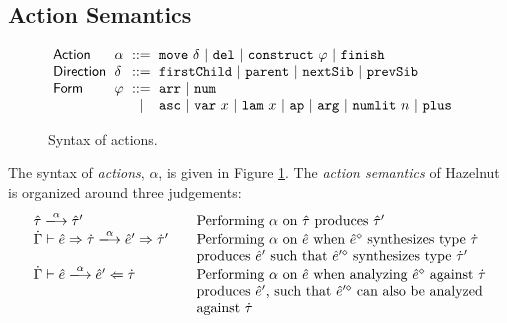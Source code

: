 \documentclass{llncs}
\begin{document}
\subsection{Action Semantics}\label{sec:actions}
\begin{figure}[t]
\hspace{-3px}$\arraycolsep=3pt\begin{array}{llcllll}
\mathsf{Action} & \alpha & ::= &
  \aMove{\delta} ~\vert~
  \aDel ~\vert~
  \aConstruct{\varphi} ~\vert~
  \aFinish\\
\mathsf{Direction} & \delta & ::= &
  \dChild ~\vert~
  \dParent ~\vert~
  \dNext ~\vert~
  \dPrev\\
\mathsf{Form} & \varphi & ::= &
  \farr ~\vert~
  \fnum \\
& & \vert &
  \fasc ~\vert~
  \fvar{x} ~\vert~
  \flam{x} ~\vert~
  \fap ~\vert~
  \farg ~\vert~
  \fnumlit{n} ~\vert~
  \fplus
\end{array}$
\caption{Syntax of actions.}
\label{fig:action-syntax}
\end{figure}

The syntax of \emph{actions}, $\alpha$, is given in Figure \ref{fig:action-syntax}. The \emph{action semantics} of Hazelnut is organized around three judgements:
\[\arraycolsep=10pt\begin{array}{ll}
\performTyp{\ztau}{\alpha}{\ztau'} & \text{Performing $\alpha$ on $\ztau$ produces $\ztau'$}\\
\performSyn{\hGamma}{\zexp}{\htau}{\alpha}{\zexp'}{\htau'} & \text{Performing $\alpha$ on $\zexp$ when $\removeSel{\zexp}$ synthesizes type $\htau$}\\
& \text{produces $\zexp'$ such that $\removeSel{\zexp'}$ synthesizes type $\htau'$}\\
\performAna{\hGamma}{\zexp}{\htau}{\alpha}{\zexp'} & \text{Performing $\alpha$ on $\zexp$ when analyzing $\removeSel{\zexp}$ against $\htau$}\\
& \text{produces $\zexp'$, such that $\removeSel{\zexp'}$ can also be analyzed}\\
& \text{against $\htau$}
\end{array}\]
\end{document}
